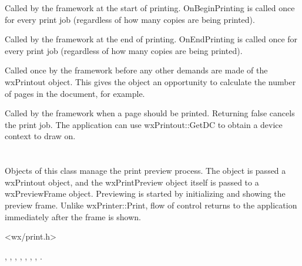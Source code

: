 
Called by the framework at the start of printing. OnBeginPrinting is called once for every
print job (regardless of how many copies are being printed).


\label{wxprintoutonendprinting}


Called by the framework at the end of printing. OnEndPrinting
is called once for every print job (regardless of how many copies are being printed).


\label{wxprintoutonprepareprinting}


Called once by the framework before any other demands are made of the
wxPrintout object. This gives the object an opportunity to calculate the
number of pages in the document, for example.


\label{wxprintoutonprintpage}


Called by the framework when a page should be printed. Returning false cancels
the print job. The application can use wxPrintout::GetDC to obtain a device
context to draw on.

\section{}\label{wxprintpreview}

Objects of this class manage the print preview process. The object is passed
a wxPrintout object, and the wxPrintPreview object itself is passed to
a wxPreviewFrame object. Previewing is started by initializing and showing
the preview frame. Unlike wxPrinter::Print, flow of control returns to the application
immediately after the frame is shown.




<wx/print.h>


, , ,\rtfsp
{}, ,\rtfsp
{}, ,\rtfsp
{}.

